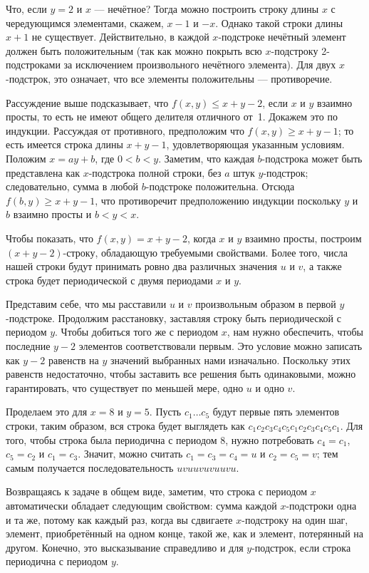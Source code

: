 Что, если $y=2$ и $x$ --- нечётное?
Тогда можно построить строку длины $x$ с чередующимся элементами, скажем, $x-1$ и $-x$.
Однако такой строки длины $x+1$ не существует.
Действительно, в каждой $x$-подстроке нечётный элемент должен быть положительным 
(так как можно покрыть всю $x$-подстроку 2-подстроками за исключением произвольного нечётного элемента).
Для двух $x$-подстрок, это означает, что все элементы положительны ---
противоречие.

Рассуждение выше подсказывает, что $f(x,y)\le x+y-2$, если $x$ и $y$ взаимно просты, 
то есть не имеют общего делителя отличного от~1.
Докажем это по индукции.
Рассуждая от противного, предположим что $f(x,y)\ge x+y-1$;
то есть имеется строка длины $x+y-1$, удовлетворяющая указанным условиям.
Положим $x=ay+b$, где $0<b<y$.
Заметим, что каждая $b$-подстрока %
может быть представлена как $x$-подстрока полной строки, 
без $a$ штук $y$-подстрок; 
следовательно, сумма в любой $b$-подстроке положительна.
Отсюда
$f(b,y)\ge x+y-1$,
что противоречит предположению индукции поскольку $y$ и $b$ взаимно просты и $b<y<x$.

Чтобы показать, что $f(x,y)=x+y-2$, когда $x$ и $y$ взаимно просты, построим $(x+y-2)$-строку, обладающую требуемыми свойствами.
Более того, числа нашей строки будут принимать ровно два различных значения $u$ и $v$,
а также строка будет периодической с двумя периодами $x$ и $y$.

Представим себе, что мы расставили $u$ и $v$ произвольным образом в первой $y$-подстроке.
Продолжим расстановку, заставляя строку быть периодической с периодом $y$.
Чтобы добиться того же с периодом $x$,
нам нужно обеспечить, чтобы последние $y-2$ элементов соответствовали первым.
Это условие можно записать как $y-2$ равенств на $y$ значений выбранных нами изначально.
Поскольку этих равенств недостаточно, чтобы заставить все решения быть одинаковыми, можно гарантировать, что существует по меньшей мере, одно $u$ и одно $v$.

Проделаем это для $x=8$ и $y=5$.
Пусть $c_1\dots c_5$ будут первые пять элементов строки, 
таким образом, вся строка будет выглядеть как
$c_1c_2c_3c_4c_5c_1c_2c_3c_4c_5c_1$.
Для того, чтобы строка была периодична с периодом 8, 
нужно потребовать $c_4=c_1$, $c_5=c_2$ и $c_1=c_3$.
Значит, можно считать $c_1=c_3=c_4=u$ и $c_2=c_5=v$; 
тем самым получается последовательность $uvuuvuvuuvu$.

Возвращаясь к задаче в общем виде, 
заметим, что строка с периодом $x$ автоматически обладает следующим свойством: сумма каждой $x$-подстроки одна и та же, потому как каждый раз, когда вы сдвигаете $x$-подстроку на один шаг, элемент, приобретённый на одном конце, такой же, как и элемент, потерянный на другом.
Конечно, это высказывание справедливо и для $y$-подстрок, если строка периодична с периодом $y$.

